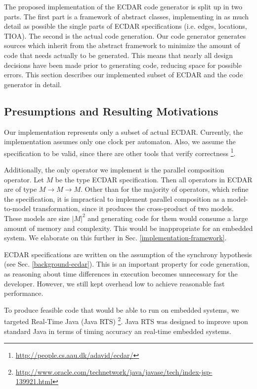 The proposed implementation of the ECDAR code generator is split up
in two parts. The first part is a framework of abstract classes, implementing
in as much detail as possible the single parts of ECDAR specifications
(i.e. edges, locations, TIOA). The second is the actual code generation.
Our code generator generates sources which inherit from the abstract
framework to minimize the amount of code that needs actually to be
generated. This means that nearly all design decisions have been made
prior to generating code, reducing space for possible errors. This
section describes our implemented subset of ECDAR and the code generator
in detail. 


\subsection{Presumptions and Resulting Motivations\label{implementation-presumptions}}

Our implementation represents only a subset of actual ECDAR. Currently,
the implementation assumes only one clock per automaton. Also, we
assume the specification to be valid, since there are other tools
that verify correctness%
\footnote{\href{}{http://people.cs.aau.dk/adavid/ecdar/}%
}.

Additionally, the only operator we implement is the parallel composition
operator. Let $M$ be the type ECDAR specification. Then all operators
in ECDAR are of type $M\rightarrow M\rightarrow M$. Other than for
the majority of operators, which refine the specification, it is impractical
to implement parallel composition as a model-to-model transformation,
since it produces the cross-product of two models. \cite{david_compositional_2012}
These models are size $|M|^{2}$ and generating code for them would
consume a large amount of memory and complexity. This would be inappropriate
for an embedded system. We elaborate on this further in Sec. \ref{implementation-framework}.

ECDAR specifications are written on the assumption of the synchrony
hypothesis (see Sec. \ref{background-ecdar}). \cite{david_compositional_2012}
This is an important property for code generation, as reasoning about
time differences in execution becomes unnecessary for the developer.
However, we still kept overhead low to achieve reasonable fast performance.

To produce feasible code that would be able to run on embedded systems,
we targeted Real-Time Java (Java RTS)%
\footnote{\href{}{http://www.oracle.com/technetwork/java/javase/tech/index-jsp-139921.html}%
}. Java RTS was designed to improve upon standard Java in terms of
timing accuracy an real-time embedded systems.


